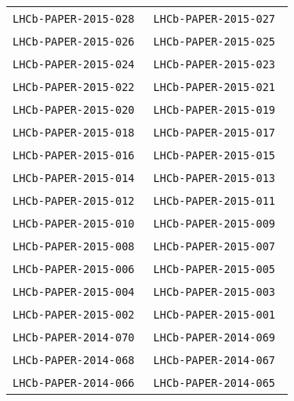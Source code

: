 \begin{center}
\begin{longtable}{ll}
\texttt{LHCb-PAPER-2015-028}~\cite{LHCb-PAPER-2015-028} &
\texttt{LHCb-PAPER-2015-027}~\cite{LHCb-PAPER-2015-027} \\
\texttt{LHCb-PAPER-2015-026}~\cite{LHCb-PAPER-2015-026} &
\texttt{LHCb-PAPER-2015-025}~\cite{LHCb-PAPER-2015-025} \\
\texttt{LHCb-PAPER-2015-024}~\cite{LHCb-PAPER-2015-024} &
\texttt{LHCb-PAPER-2015-023}~\cite{LHCb-PAPER-2015-023} \\
\texttt{LHCb-PAPER-2015-022}~\cite{LHCb-PAPER-2015-022} &
\texttt{LHCb-PAPER-2015-021}~\cite{LHCb-PAPER-2015-021} \\
\texttt{LHCb-PAPER-2015-020}~\cite{LHCb-PAPER-2015-020} &
\texttt{LHCb-PAPER-2015-019}~\cite{LHCb-PAPER-2015-019} \\
\texttt{LHCb-PAPER-2015-018}~\cite{LHCb-PAPER-2015-018} &
\texttt{LHCb-PAPER-2015-017}~\cite{LHCb-PAPER-2015-017} \\
\texttt{LHCb-PAPER-2015-016}~\cite{LHCb-PAPER-2015-016} &
\texttt{LHCb-PAPER-2015-015}~\cite{LHCb-PAPER-2015-015} \\
\texttt{LHCb-PAPER-2015-014}~\cite{LHCb-PAPER-2015-014} &
\texttt{LHCb-PAPER-2015-013}~\cite{LHCb-PAPER-2015-013} \\
\texttt{LHCb-PAPER-2015-012}~\cite{LHCb-PAPER-2015-012} &
\texttt{LHCb-PAPER-2015-011}~\cite{LHCb-PAPER-2015-011} \\
\texttt{LHCb-PAPER-2015-010}~\cite{LHCb-PAPER-2015-010} &
\texttt{LHCb-PAPER-2015-009}~\cite{LHCb-PAPER-2015-009} \\
\texttt{LHCb-PAPER-2015-008}~\cite{LHCb-PAPER-2015-008} &
\texttt{LHCb-PAPER-2015-007}~\cite{LHCb-PAPER-2015-007} \\
\texttt{LHCb-PAPER-2015-006}~\cite{LHCb-PAPER-2015-006} &
\texttt{LHCb-PAPER-2015-005}~\cite{LHCb-PAPER-2015-005} \\
\texttt{LHCb-PAPER-2015-004}~\cite{LHCb-PAPER-2015-004} &
\texttt{LHCb-PAPER-2015-003}~\cite{LHCb-PAPER-2015-003} \\
\texttt{LHCb-PAPER-2015-002}~\cite{LHCb-PAPER-2015-002} &
\texttt{LHCb-PAPER-2015-001}~\cite{LHCb-PAPER-2015-001} \\
\hline
\texttt{LHCb-PAPER-2014-070}~\cite{LHCb-PAPER-2014-070} &
\texttt{LHCb-PAPER-2014-069}~\cite{LHCb-PAPER-2014-069} \\
\texttt{LHCb-PAPER-2014-068}~\cite{LHCb-PAPER-2014-068} &
\texttt{LHCb-PAPER-2014-067}~\cite{LHCb-PAPER-2014-067} \\
\texttt{LHCb-PAPER-2014-066}~\cite{LHCb-PAPER-2014-066} &
\texttt{LHCb-PAPER-2014-065}~\cite{LHCb-PAPER-2014-065} \\

\end{longtable}
\end{center}
